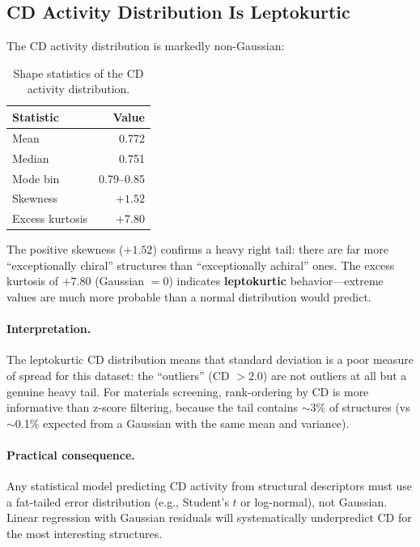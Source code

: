 \documentclass[11pt,a4paper]{article}
\begin{document}
\subsection{CD Activity Distribution Is Leptokurtic}

The CD activity distribution is markedly non-Gaussian:

\begin{table}[H]
\centering
\caption{Shape statistics of the CD activity distribution.}
\label{tab:shape}
\begin{tabular}{lr}
\toprule
Statistic & Value \\
\midrule
Mean & 0.772 \\
Median & 0.751 \\
Mode bin & 0.79--0.85 \\
Skewness & $+1.52$ \\
Excess kurtosis & $+7.80$ \\
\bottomrule
\end{tabular}
\end{table}

\noindent The positive skewness ($+1.52$) confirms a heavy right tail: there are far more ``exceptionally chiral'' structures than ``exceptionally achiral'' ones. The excess kurtosis of $+7.80$ (Gaussian $= 0$) indicates \textbf{leptokurtic} behavior---extreme values are much more probable than a normal distribution would predict.

\paragraph{Interpretation.} The leptokurtic CD distribution means that standard deviation is a poor measure of spread for this dataset: the ``outliers'' (CD $> 2.0$) are not outliers at all but a genuine heavy tail. For materials screening, rank-ordering by CD is more informative than z-score filtering, because the tail contains $\sim$3\% of structures (vs $\sim$0.1\% expected from a Gaussian with the same mean and variance).

\paragraph{Practical consequence.} Any statistical model predicting CD activity from structural descriptors must use a fat-tailed error distribution (e.g., Student's $t$ or log-normal), not Gaussian. Linear regression with Gaussian residuals will systematically underpredict CD for the most interesting structures.
\end{document}
